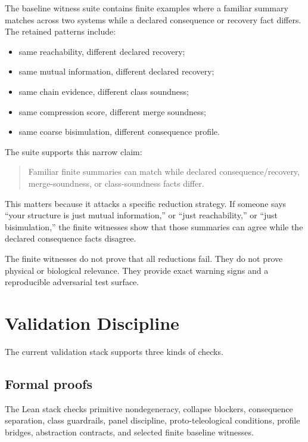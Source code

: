 \documentclass[11pt]{article}
\begin{document}
The baseline witness suite contains finite examples where a familiar summary
matches across two systems while a declared consequence or recovery fact
differs. The retained patterns include:

\begin{itemize}[leftmargin=*]
  \item same reachability, different declared recovery;
  \item same mutual information, different declared recovery;
  \item same chain evidence, different class soundness;
  \item same compression score, different merge soundness;
  \item same coarse bisimulation, different consequence profile.
\end{itemize}

The suite supports this narrow claim:

\begin{quote}
Familiar finite summaries can match while declared consequence/recovery,
merge-soundness, or class-soundness facts differ.
\end{quote}

This matters because it attacks a specific reduction strategy. If someone says
``your structure is just mutual information,'' or ``just reachability,'' or
``just bisimulation,'' the finite witnesses show that those summaries can agree
while the declared consequence facts disagree.

The finite witnesses do not prove that all reductions fail. They do not prove
physical or biological relevance. They provide exact warning signs and a
reproducible adversarial test surface.

\section{Validation Discipline}

The current validation stack supports three kinds of checks.

\subsection{Formal proofs}

The Lean stack checks primitive nondegeneracy, collapse blockers, consequence
separation, class guardrails, panel discipline, proto-teleological conditions,
profile bridges, abstraction contracts, and selected finite baseline
witnesses.
\end{document}
